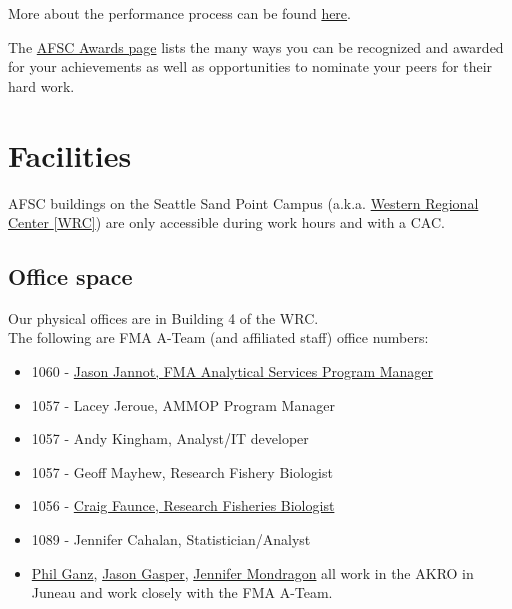 \documentclass[
  letterpaper,
  DIV=11,
  numbers=noendperiod]{scrreprt}
\providecommand{\tightlist}{%
  \setlength{\itemsep}{0pt}\setlength{\parskip}{0pt}}\usepackage{longtable,booktabs,array}
\begin{document}
More about the performance process can be found
\href{https://sites.google.com/noaa.gov/inside-fisheries-hc/human-capital/performance-culture-incentive-and-honorary-awards/commerce-alternative-personnel-system-caps}{here}.

The
\href{https://sites.google.com/noaa.gov/myafsc/administrative/workforce-management/awards}{AFSC
Awards page} lists the many ways you can be recognized and awarded for
your achievements as well as opportunities to nominate your peers for
their hard work.

\hypertarget{facilities}{%
\section{Facilities}\label{facilities}}

AFSC buildings on the Seattle Sand Point Campus (a.k.a.
\href{https://www.wrc.noaa.gov/}{Western Regional Center {[}WRC{]}}) are
only accessible during work hours and with a CAC.

\hypertarget{office-space}{%
\subsection{Office space}\label{office-space}}

Our physical offices are in Building 4 of the WRC.\\
The following are FMA A-Team (and affiliated staff) office numbers:

\begin{itemize}
\tightlist
\item
  1060 -
  \href{https://www.fisheries.noaa.gov/contact/jason-e-jannot}{Jason
  Jannot, FMA Analytical Services Program Manager}
\item
  1057 - Lacey Jeroue, AMMOP Program Manager
\item
  1057 - Andy Kingham, Analyst/IT developer
\item
  1057 - Geoff Mayhew, Research Fishery Biologist
\item
  1056 -
  \href{https://www.fisheries.noaa.gov/contact/craig-h-faunce}{Craig
  Faunce, Research Fisheries Biologist}
\item
  1089 - Jennifer Cahalan, Statistician/Analyst
\item
  \href{https://www.fisheries.noaa.gov/contact/phil-ganz}{Phil Ganz},
  \href{https://www.fisheries.noaa.gov/contact/jason-gasper-phd}{Jason
  Gasper},
  \href{https://www.fisheries.noaa.gov/contact/jennifer-mondragon}{Jennifer
  Mondragon} all work in the AKRO in Juneau and work closely with the
  FMA A-Team.
\end{itemize}
\end{document}
